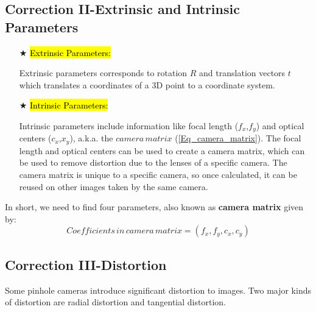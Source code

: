 \documentclass{article}
\begin{document}
\subsection{Correction II-Extrinsic and Intrinsic Parameters}
\label{ssec:Correction2_math}
\begin{itemize}
	\item [$\bigstar$] \hl{Extrinsic Parameters:}
	
		Extrinsic parameters corresponds to rotation $R$ and translation vectors $t$ which translates a coordinates of a 3D point to a coordinate system.
		
	\item [$\bigstar$] \hl{Intrinsic Parameters:}	
	
		Intrinsic parameters include information like focal length ($f_x$,$f_y$) and optical centers ($c_x$,$x_y$), a.k.a. the $camera\,matrix$ (\ref{Eq_camera_matrix}). The focal length and optical centers can be used to create a camera matrix, which can be used to remove distortion due to the lenses of a specific camera. The camera matrix is unique to a specific camera, so once calculated, it can be reused on other images taken by the same camera. 
		
\end{itemize}
In short, we need to find four parameters, also known as \textbf{camera matrix} given by:
\begin{equation}
Coefficients\,in\,camera\,matrix = (f_x, f_y, c_x, c_y)
\label{Eq_camera_coeff}
\end{equation}

\subsection{Correction III-Distortion}
\label{ssec:Correction3_math}
Some pinhole cameras introduce significant distortion to images. Two major kinds of distortion are radial distortion and tangential distortion.
\end{document}
